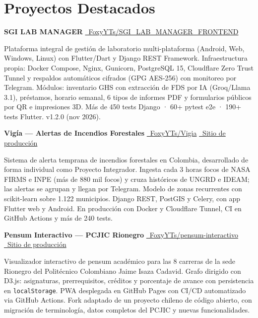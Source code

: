 \documentclass[11pt, a4paper]{article}
\begin{document}
\section{Proyectos Destacados}

\noindent\textbf{\color{primary}SGI LAB MANAGER} \hfill
\href{https://github.com/FoxyYTs/SGI_LAB_MANAGER_FRONTEND}{\small\faGithub\ FoxyYTs/SGI\_LAB\_MANAGER\_FRONTEND}

Plataforma integral de gestión de laboratorio multi-plataforma (Android, Web, Windows, Linux)
con Flutter/Dart y Django REST Framework. Infraestructura propia: Docker Compose, Nginx,
Gunicorn, PostgreSQL 15, Cloudflare Zero Trust Tunnel y respaldos automáticos cifrados
(GPG AES-256) con monitoreo por Telegram. Módulos: inventario GHS con extracción de FDS
por IA (Groq/Llama 3.1), préstamos, horario semanal, 6 tipos de informes PDF y formularios
públicos por QR e impresiones 3D. Más de 450 tests Django · 60+ pytest e2e · 190+ tests Flutter.
v1.2.0 (nov 2026).

\vspace{6pt}
\noindent\textbf{\color{primary}Vigía — Alertas de Incendios Forestales} \hfill
\href{https://github.com/FoxyYTs/Vigia}{\small\faGithub\ FoxyYTs/Vigia} \quad
\href{https://vigia.foxyyts.qzz.io}{\small\faGlobe\ Sitio de producción}

Sistema de alerta temprana de incendios forestales en Colombia, desarrollado de forma
individual como Proyecto Integrador. Ingesta cada 3 horas focos de NASA FIRMS e INPE
(más de 880 mil focos) y cruza históricos de UNGRD e IDEAM; las alertas se agrupan y
llegan por Telegram. Modelo de zonas recurrentes con scikit-learn sobre 1.122 municipios.
Django REST, PostGIS y Celery, con app Flutter web y Android. En producción con Docker y
Cloudflare Tunnel, CI en GitHub Actions y más de 240 tests.

\vspace{6pt}
\noindent\textbf{\color{primary}Pensum Interactivo — PCJIC Rionegro} \hfill
\href{https://github.com/FoxyYTs/pensum-interactivo}{\small\faGithub\ FoxyYTs/pensum-interactivo} \quad
\href{https://foxyyts.github.io/pensum-interactivo}{\small\faGlobe\ Sitio de producción}

Visualizador interactivo de pensum académico para las 8 carreras de la sede Rionegro del
Politécnico Colombiano Jaime Isaza Cadavid. Grafo dirigido con D3.js: asignaturas,
prerrequisitos, créditos y porcentaje de avance con persistencia en \texttt{localStorage}.
PWA desplegada en GitHub Pages con CI/CD automatizado via GitHub Actions. Fork adaptado
de un proyecto chileno de código abierto, con migración de terminología, datos completos
del PCJIC y nuevas funcionalidades.
\end{document}
